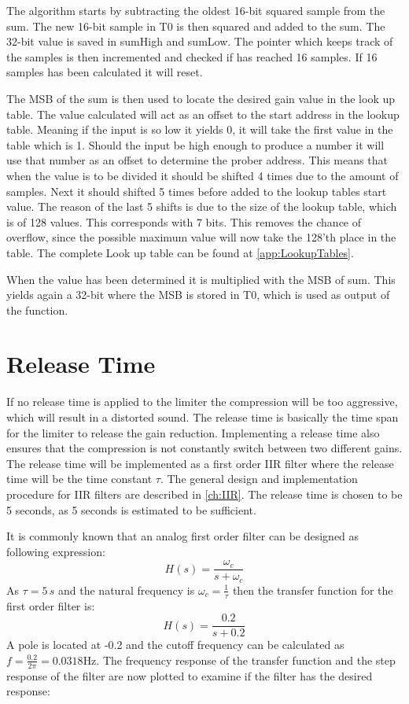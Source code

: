 The algorithm starts by subtracting the oldest 16-bit squared sample from the sum. The new 16-bit sample in T0 is then squared and added to the sum. The 32-bit value is saved in sumHigh and sumLow. The pointer which keeps track of the samples is then incremented and checked if has reached 16 samples. If 16 samples has been calculated it will reset.

The MSB of the sum is then used to locate the desired gain value in the look up table. The value calculated will act as an offset to the start address in the lookup table. Meaning if the input is so low it yields 0, it will take the first value in the table which is 1. Should the input be high enough to produce a number it will use that number as an offset to determine the prober address. This means that when the value is to be divided it should be shifted 4 times due to the amount of samples. Next it should shifted 5 times before added to the lookup tables start value. The reason of the last 5 shifts is due to the size of the lookup table, which is of 128 values. This corresponds with 7 bits. This removes the chance of overflow, since the possible maximum value will now take the 128'th place in the table. The complete Look up table can be found at \autoref{app:LookupTables}. 

When the value has been determined it is multiplied with the MSB of sum. This yields again a 32-bit where the MSB is stored in T0, which is used as output of the function.


\section{Release Time}

If no release time is applied to the limiter the compression will be too aggressive, which will result in a distorted sound. The release time is basically the time span for the limiter to release the gain reduction. Implementing a release time also ensures that the compression is not constantly switch between two different gains. The release time will be implemented as a first order IIR filter where the release time will be the time constant $\tau$. The general design and implementation procedure for IIR filters are described in \autoref{ch:IIR}. The release time is chosen to be 5 seconds, as 5 seconds is estimated to be sufficient.

It is commonly known that an analog first order filter can be designed as following expression:
\begin{equation}
H(s) = \frac{\omega_c}{s+\omega_c}
\end{equation}
As $\tau = 5\, s$ and the natural frequency is $\omega_c = \frac{1}{\tau}$ then the transfer function for the first order filter is:
\begin{equation}
H(s) = \frac{0.2}{s+0.2}
\end{equation} 
A pole is located at -0.2 and the cutoff frequency can be calculated as $f = \frac{0.2}{2\pi} = 0.0318 \text{Hz}$. The frequency response of the transfer function and the step response of the filter are now plotted to examine if the filter has the desired response:

